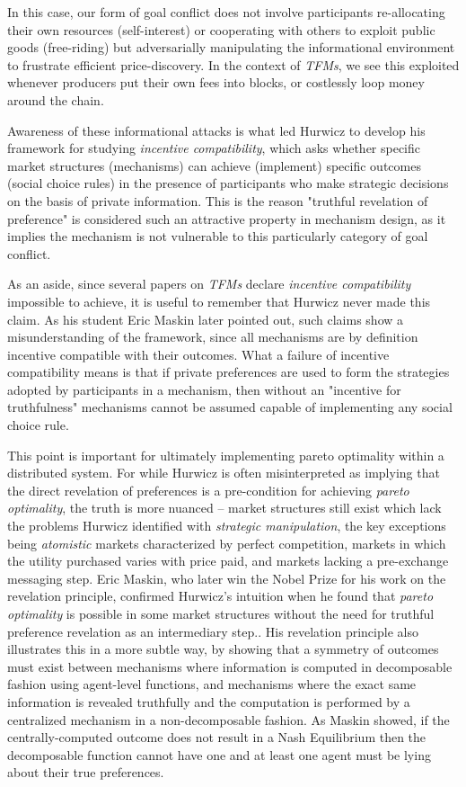 In this case, our form of goal conflict does not involve participants re-allocating their own resources (self-interest) or cooperating with others to exploit public goods (free-riding) but adversarially manipulating the informational environment to frustrate efficient price-discovery. In the context of \textit{TFMs}, we see this exploited whenever producers put their own fees into blocks, or costlessly loop money around the chain.

Awareness of these informational attacks is what led Hurwicz to develop his framework for studying \textit{incentive compatibility}, which asks whether specific market structures (mechanisms) can achieve (implement) specific outcomes (social choice rules) in the presence of participants who make strategic decisions on the basis of private information. This is the reason "truthful revelation of preference" is considered such an attractive property in mechanism design, as it implies the mechanism is not vulnerable to this particularly category of goal conflict.

As an aside, since several papers on \textit{TFMs} declare \textit{incentive compatibility} impossible to achieve, it is useful to remember that Hurwicz never made this claim. As his student Eric Maskin later pointed out, such claims show a misunderstanding of the framework, since all mechanisms are by definition incentive compatible with their outcomes. What a failure of incentive compatibility means is that if private preferences are used to form the strategies adopted by participants in a mechanism, then without an "incentive for truthfulness" mechanisms cannot be assumed capable of implementing any social choice rule. 

This point is important for ultimately implementing {pareto optimality} within a distributed system. For while Hurwicz is often misinterpreted as implying that the direct revelation of preferences is a pre-condition for achieving \textit{pareto optimality}, the truth is more nuanced -- market structures still exist which lack the problems Hurwicz identified with \textit{strategic manipulation}, the key exceptions being \textit{atomistic} markets characterized by perfect competition, markets in which the utility purchased varies with price paid, and markets lacking a pre-exchange messaging step. Eric Maskin, who later win the Nobel Prize for his work on the revelation principle, confirmed Hurwicz's intuition when he found that \textit{pareto optimality} is possible in some market structures without the need for truthful preference revelation as an intermediary step.\citet{maskin1999nash}. His revelation principle also illustrates this in a more subtle way, by showing that a symmetry of outcomes must exist between mechanisms where information is computed in decomposable fashion using agent-level functions, and mechanisms where the exact same information is revealed truthfully and the computation is performed by a centralized mechanism in a non-decomposable fashion. As Maskin showed, if the centrally-computed outcome does not result in a Nash Equilibrium then the decomposable function cannot have one and at least one agent must be lying about their true preferences.


